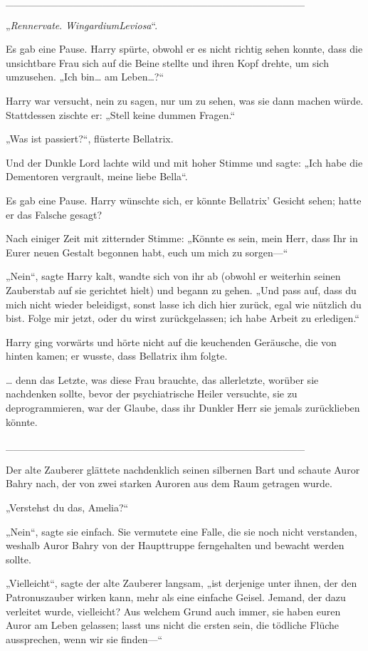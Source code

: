 {\_\_\_\_\_\_\_\_\_\_\_\_\_\_\_\_\_\_\_\_\_\_\_\_\_\_\_\_\_\_\_\_\_\_\_\_\_\_\_\_

„\emph{Rennervate}. \emph{WingardiumLeviosa}“.

Es gab eine Pause. Harry spürte, obwohl er es nicht richtig sehen konnte, dass die unsichtbare Frau sich auf die Beine stellte und ihren Kopf drehte, um sich umzusehen. „Ich bin… am Leben…?“

Harry war versucht, nein zu sagen, nur um zu sehen, was sie dann machen würde. Stattdessen zischte er: „Stell keine dummen Fragen.“

„Was ist passiert?“, flüsterte Bellatrix.

Und der Dunkle Lord lachte wild und mit hoher Stimme und sagte: „Ich habe die Dementoren vergrault, meine liebe Bella“.

Es gab eine Pause. Harry wünschte sich, er könnte Bellatrix' Gesicht sehen; hatte er das Falsche gesagt?

Nach einiger Zeit mit zitternder Stimme: „Könnte es sein, mein Herr, dass Ihr in Eurer neuen Gestalt begonnen habt, euch um mich zu sorgen—“

„Nein“, sagte Harry kalt, wandte sich von ihr ab (obwohl er weiterhin seinen Zauberstab auf sie gerichtet hielt) und begann zu gehen. „Und pass auf, dass du mich nicht wieder beleidigst, sonst lasse ich dich hier zurück, egal wie nützlich du bist. Folge mir jetzt, oder du wirst zurückgelassen; ich habe Arbeit zu erledigen.“

Harry ging vorwärts und hörte nicht auf die keuchenden Geräusche, die von hinten kamen; er wusste, dass Bellatrix ihm folgte.

… denn das Letzte, was diese Frau brauchte, das allerletzte, worüber sie nachdenken sollte, bevor der psychiatrische Heiler versuchte, sie zu deprogrammieren, war der Glaube, dass ihr Dunkler Herr sie jemals zurücklieben könnte.

\_\_\_\_\_\_\_\_\_\_\_\_\_\_\_\_\_\_\_\_\_\_\_\_\_\_\_\_\_\_\_\_\_\_\_\_\_\_\_\_

Der alte Zauberer glättete nachdenklich seinen silbernen Bart und schaute Auror Bahry nach, der von zwei starken Auroren aus dem Raum getragen wurde.

„Verstehst du das, Amelia?“

„Nein“, sagte sie einfach. Sie vermutete eine Falle, die sie noch nicht verstanden, weshalb Auror Bahry von der Haupttruppe ferngehalten und bewacht werden sollte.

„Vielleicht“, sagte der alte Zauberer langsam, „ist derjenige unter ihnen, der den Patronuszauber wirken kann, mehr als eine einfache Geisel. Jemand, der dazu verleitet wurde, vielleicht? Aus welchem Grund auch immer, sie haben euren Auror am Leben gelassen; lasst uns nicht die ersten sein, die tödliche Flüche aussprechen, wenn wir sie finden—“

}
